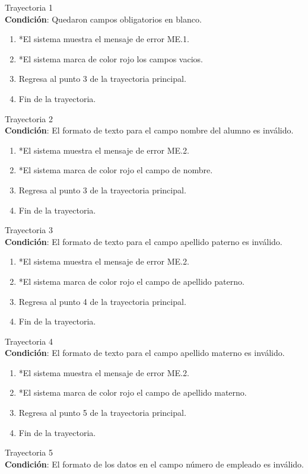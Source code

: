 \large{Trayectoria 1}\\
\textbf{Condición}: Quedaron campos obligatorios en blanco.
\begin{enumerate}
    \item *El sistema muestra el mensaje de error ME.1.
    \item *El sistema marca de color rojo los campos vacios.
    \item Regresa al punto 3 de la trayectoria principal.
    \item Fin de la trayectoria.
\end{enumerate}
\large{Trayectoria 2}\\
\textbf{Condición}: El formato de texto para el campo nombre del alumno es inválido.
\begin{enumerate}
    \item *El sistema muestra el mensaje de error ME.2.
    \item *El sistema marca de color rojo el campo de nombre.
    \item Regresa al punto 3 de la trayectoria principal.
    \item Fin de la trayectoria.
\end{enumerate}
\large{Trayectoria 3}\\
\textbf{Condición}: El formato de texto para el campo apellido paterno es inválido.
\begin{enumerate}
    \item *El sistema muestra el mensaje de error ME.2.
    \item *El sistema marca de color rojo el campo de apellido paterno.
    \item Regresa al punto 4 de la trayectoria principal.
    \item Fin de la trayectoria.
\end{enumerate}
\large{Trayectoria 4}\\
\textbf{Condición}: El formato de texto para el campo apellido materno es inválido.
\begin{enumerate}
    \item *El sistema muestra el mensaje de error ME.2.
    \item *El sistema marca de color rojo el campo de apellido materno.
    \item Regresa al punto 5 de la trayectoria principal.
    \item Fin de la trayectoria.
\end{enumerate}
\large{Trayectoria 5}\\
\textbf{Condición}: El formato de los datos en el campo número de empleado es inválido.
